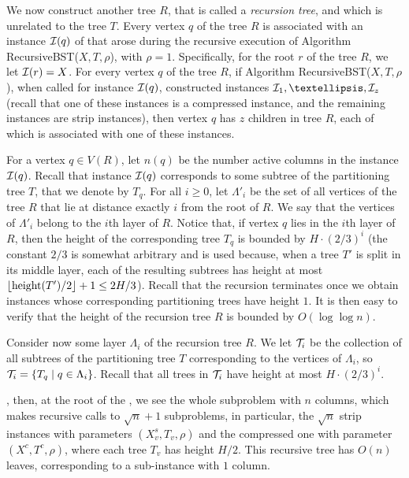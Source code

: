 \documentclass[11pt]{article}
\numberwithin{equation}{section}
\theoremstyle{definition}
\theoremstyle{plain}
\begin{document}
We now construct another tree $R$, that is called a \emph{recursion tree}, and which is unrelated to the tree $T$. Every vertex $q$ of the tree $R$ is associated with an instance ${\mathcal{I}}(q)$ of \minsat that arose during the recursive execution of Algorithm {\sc RecursiveBST}($X,T,\rho$), with $\rho=1$. 
Specifically, for the root $r$ of the tree $R$, we let ${\mathcal{I}}(r)=X$. For every vertex $q$ of the tree $R$, if Algorithm  {\sc RecursiveBST}($X,T,\rho$), when called for instance ${\mathcal{I}}(q)$, constructed instances $\iset_1,\ldots,\iset_z$ (recall that one of these instances is a compressed instance, and the remaining instances are strip instances), then vertex $q$ has $z$ children in tree $R$, each of which is associated with one of these instances.

For a vertex $q\in V(R)$, let $n(q)$ be the number active columns in the instance ${\mathcal{I}}(q)$. 
Recall that instance ${\mathcal{I}}(q)$ corresponds to some subtree of the partitioning tree $T$, that we denote by $T_q$. 
For all $i\geq 0$, let $\Lambda'_i$ be the set of all vertices of the tree $R$ that lie at distance exactly $i$ from the root of $R$. We say that the vertices of $\Lambda'_i$ belong to the $i$th layer of $R$. Notice that, if vertex $q$ lies in the $i$th layer of $R$, then the height of the corresponding tree $T_q$ is bounded by $H\cdot (2/3)^i$ (the constant $2/3$ is somewhat arbitrary and is used because, when a tree $T'$ is split in its middle layer, each of the resulting subtrees has height at most $\left\lfloor\operatorname{height}(T')/2\right\rfloor+1\leq 2H/3$).
Recall that the recursion terminates once we obtain instances whose corresponding partitioning trees have height $1$. It is then easy to verify that the height of the recursion tree $R$ is bounded by $O(\log\log n)$.

%
%
%
%


Consider now some layer $\Lambda_i$ of the recursion tree $R$. We let ${\mathcal T}_i$ be the collection of all subtrees of the partitioning tree $T$ corresponding to the vertices of $\Lambda_i$, so ${\mathcal T}_i=\left\{ T_q\mid q\in \Lambda_i \right\}$. Recall that all trees in ${\mathcal T}_i$ have height at most $H\cdot (2/3)^i$.


\iffalse
, then, at the root of the , we see the whole subproblem with $n$ columns, which makes recursive calls to $\sqrt{n}+1$ subproblems, in particular, the $\sqrt{n}$ strip instances with parameters $(X^s_v, T_v, \rho)$ and the compressed one with parameter $(X^c, T^c, \rho)$, where each tree $T_v$ has height $H/2$.
This recursive tree has $O(n)$ leaves, corresponding to a sub-instance with $1$ column. 
 
\end{document}
